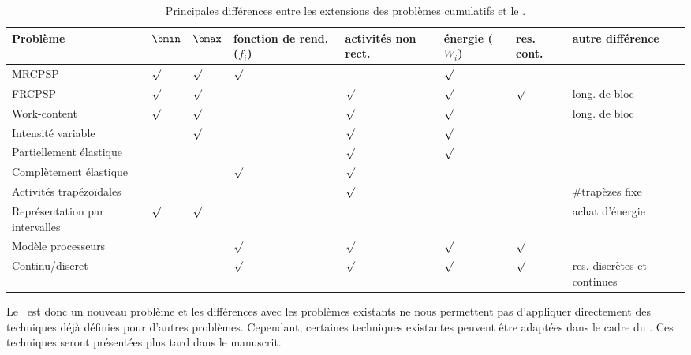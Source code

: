 \begin{table}[!htb]
  \centering
\small
  \begin{tabular}{|>{\centering\arraybackslash} m{3cm}|>{\centering\arraybackslash} m{0.8cm}|>{\centering\arraybackslash} m{0.8cm}|>{\centering\arraybackslash} m{1.9cm}|>{\centering\arraybackslash} m{1.4cm}|>{\centering\arraybackslash} m{1.2cm}|>{\centering\arraybackslash} m{1cm}|>{\centering\arraybackslash} m{2.3cm}|}
    \hline    
    Problème & $\bmin$ & $\bmax$ & fonction de rend. ($f_i$) &
                                                                   activités
                                                                   non
                                                               rect.
    & 
                                                                 énergie
                                                                   ($W_i$)
    & res. cont. & autre différence \\
\hline
MRCPSP \cite{DDH} & $\surd$ & $\surd$ & $\surd$ &    & $\surd$ &  & \\
\hline
 FRCPSP \cite{NK} & $\surd$ & $\surd$ &    & $\surd$ & $\surd$ & $\surd$ & long. de bloc\\  
\hline
Work-content \cite{FT} & $\surd$ & $\surd$ & & $\surd$ & $\surd$ &  & long. de bloc\\  
\hline
Intensité variable \cite{Kis} &  & $\surd$&  & $\surd$ & $\surd$ & & \\   
\hline
Partiellement élastique \cite{BLPN} & & & & $\surd$ & $\surd$ & &\\
\hline
Complètement élastique \cite{BLPN} & & & $\surd$ & $\surd$ & & &\\
\hline
Activités trapézoïdales \cite{BP} & & & & $\surd$ & & &\#trapèzes fixe\\
\hline
Représentation par intervalles \cite{V09} & $\surd$ & $\surd$ & & & & & achat
                                                            d'énergie\\  
\hline
Modèle processeurs \cite{Blaz} & &  & $\surd$& $\surd$& $\surd$& $\surd$& \\ 
\hline
Continu/discret \cite{Wali}&  & &$\surd$ &$\surd$ & $\surd$& $\surd$& res. discrètes et continues\\ 
\hline
  \end{tabular}
  \caption{Principales différences entre les extensions des problèmes
    cumulatifs et le \CECSP.}
  \label{tab:dif_CECSP}
\end{table}

Le \CECSP~est donc un nouveau problème et les différences avec les
problèmes existants ne nous permettent pas d'appliquer directement des
techniques déjà définies pour d'autres problèmes. Cependant, certaines
techniques existantes peuvent être adaptées dans le cadre du
\CECSP. Ces techniques seront présentées plus tard dans le manuscrit.

